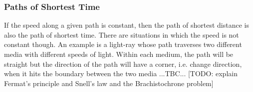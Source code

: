 
\subsubsection{Paths of Shortest Time}
If the speed along a given path is constant, then the path of shortest distance is also the path of shortest time. There are situations in which the speed is not constant though. An example is a light-ray whose path traverses two different media with different speeds of light. Within each medium, the path will be straight but the direction of the path will have a corner, i.e. change direction, when it hits the boundary between the two media ...TBC... [TODO: explain Fermat's principle and Snell's law and the Brachistochrone problem]







